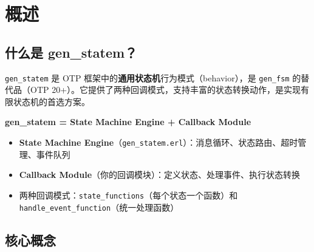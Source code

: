 \documentclass[a4paper,11pt]{article}
\begin{document}
\section{概述}

\subsection{什么是 gen\_statem？}

\texttt{gen\_statem} 是 OTP 框架中的\textbf{通用状态机}行为模式（behavior），是 \texttt{gen\_fsm} 的替代品（OTP 20+）。它提供了两种回调模式，支持丰富的状态转换动作，是实现有限状态机的首选方案。

\begin{tipbox}[核心思想]
\textbf{gen\_statem = State Machine Engine + Callback Module}

\begin{itemize}[leftmargin=1.5em]
    \item \textbf{State Machine Engine}（\texttt{gen\_statem.erl}）：消息循环、状态路由、超时管理、事件队列
    \item \textbf{Callback Module}（你的回调模块）：定义状态、处理事件、执行状态转换
    \item 两种回调模式：\texttt{state\_functions}（每个状态一个函数）和 \texttt{handle\_event\_function}（统一处理函数）
\end{itemize}
\end{tipbox}

\subsection{核心概念}
\end{document}
